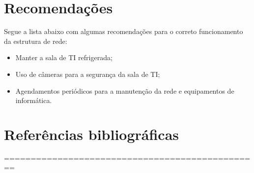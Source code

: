 \documentclass[	DIV=calc,%
							paper=a4,%
							fontsize=12pt,%
							onecolumn]{scrartcl}	 					%
\begin{document}


\newpage
\section{Recomendações}
Segue a lista abaixo com algumas recomendações para o correto funcionamento da estrutura de rede:

\begin{itemize}
	\item Manter a sala de TI refrigerada;
	\item Uso de câmeras para a segurança da sala de TI;
	\item Agendamentos periódicos para a manutenção da rede e equipamentos de informática.
\end{itemize}

\section{Referências bibliográficas}

\renewcommand\refname{} %

  

 ================================================
\end{document}
